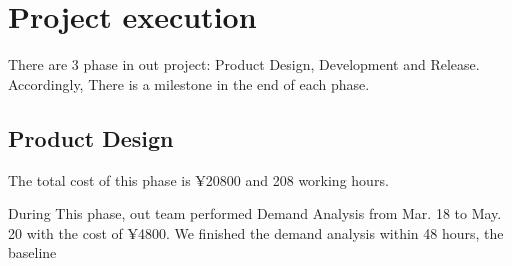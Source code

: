 \documentclass[runningheads]{llncs}
\begin{document}
\section{Project execution}
There are 3 phase in out project: Product Design, Development and Release. Accordingly, There is a milestone in the end of each phase.


\subsection{Product Design}
The total cost of this phase is ¥20800 and 208 working hours. 

During This phase, out team performed Demand Analysis from Mar. 18 to May. 20 with the cost of ¥4800.
We finished the demand analysis within 48 hours, the baseline
\end{document}
